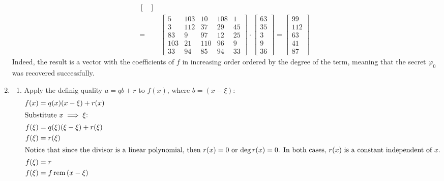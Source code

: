 \documentclass[11pt,a4paper]{article}
\begin{document}
\begin{enumerate}
\begin{align*}
\begin{bmatrix}
                                                   \end{bmatrix}               \\
              =         & \begin{bmatrix}
                              5   & 103 & 10  & 108 & 1  \\
                              3   & 112 & 37  & 29  & 45 \\
                              83  & 9   & 97  & 12  & 25 \\
                              103 & 21  & 110 & 96  & 9  \\
                              33  & 94  & 85  & 94  & 33
                          \end{bmatrix} \cdot \begin{bmatrix}
                                                  63 \\ 35 \\ 3 \\ 9 \\ 36
                                              \end{bmatrix} = \begin{bmatrix}
                                                                  99 \\ 112 \\ 63 \\ 41 \\ 87
                                                              \end{bmatrix}
          \end{align*}
          Indeed, the result is a vector with the coefficients of $f$ in increasing order ordered by the degree of the term, meaning that the
          secret $\varphi_0$ was recovered successfully.
          \newpage

    \item \begin{enumerate}
              \item Apply the definig quality $a = qb + r$ to $f(x)$, where $b = (x - \xi)$:
                    \begin{align*}
                        f(x)   & = q(x)(x - \xi) + r(x)       \\
                        \intertext{Substitute $x \implies \xi$:}
                        f(\xi) & = q(\xi)(\xi - \xi) + r(\xi) \\
                        f(\xi) & = r(\xi)                     \\
                        \intertext{Notice that since the divisor is a linear polynomial, then $r(x) = 0$ or $\deg{r(x)} = 0$. In both cases,
                        $r(x)$ is a constant independent of $x$.}
                        f(\xi) & = r \\
                        f(\xi) & = f\operatorname{rem}{(x - \xi)}
                    \end{align*}
          \end{enumerate}


\end{enumerate}
\end{document}
